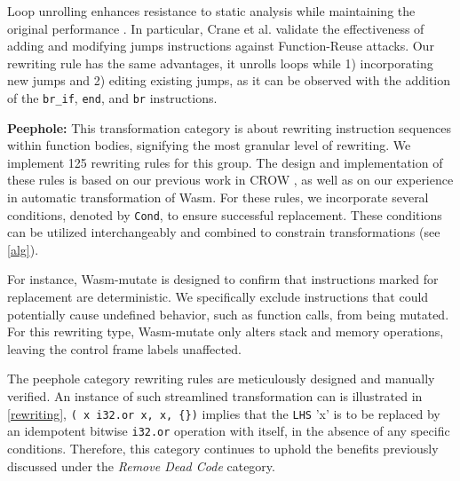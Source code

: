 \documentclass[sigplan,screen]{acmart}
\newcommand*\badge[1]{ \colorbox{red}{\color{white}#1}}
\newcommand{\tool}{Wasm-mutate\xspace}
\newcommand{\wasm}{Wasm\xspace}
\newcommand{\todo}[1]{%
\refstepcounter{todo}
\noindent\textbf{\badge{TODO}} {\color{red}#1}
\addcontentsline{td}{todo}
{\color{red}\thesection.\thetodo\xspace #1}}
\begin{document}
Loop unrolling enhances resistance to static analysis while maintaining the original performance \cite{10.1145/3453483.3454035}. 
In particular, Crane et al. \cite{10.1145/2810103.2813682} validate the effectiveness of adding and modifying jumps instructions against Function-Reuse attacks.
Our rewriting rule has the same advantages, it unrolls loops while 1) incorporating new jumps and 2) editing existing jumps, as it can be observed with the addition of the \texttt{br_if}, \texttt{end}, and \texttt{br} instructions. 



\textbf{Peephole:} 
This transformation category is about rewriting instruction sequences within function bodies, signifying the most granular level of rewriting. 
We implement 125 rewriting rules for this group. 
The design and implementation of these rules is based on our previous work in CROW \cite{arteaga2020crow}, as well as on our experience in automatic transformation of \wasm.
For these rules, we incorporate several conditions, denoted by \texttt{Cond}, to ensure successful replacement. 
These conditions can be utilized interchangeably and combined to constrain transformations (see \autoref{alg}).

For instance, \tool is designed to confirm that instructions marked for replacement are deterministic. 
We specifically exclude instructions that could potentially cause undefined behavior, such as function calls, from being mutated. 
For this rewriting type, \tool only alters stack and memory operations, leaving the control frame labels unaffected.

The peephole category rewriting rules are meticulously designed and manually verified. 
An instance of such streamlined transformation can is illustrated in \autoref{rewriting}, \texttt{(\ x\ i32.or\ x, x, \{\})} implies that the \texttt{LHS} 'x' is to be replaced by an idempotent bitwise \texttt{i32.or} operation with itself, in the absence of any specific conditions.
Therefore, this category continues to uphold the benefits previously discussed under the \emph{Remove Dead Code} category.

\end{document}
